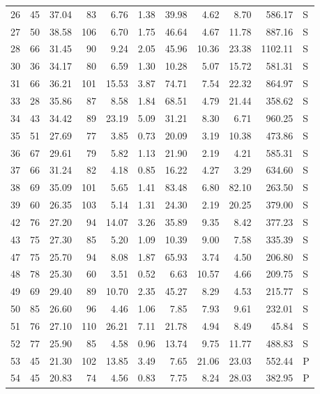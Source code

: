 \begin{table}[ht]
\begin{tabular}{rrrrrrrrrrl}
  26 &  45 & 37.04 &  83 & 6.76 & 1.38 & 39.98 & 4.62 & 8.70 & 586.17 & S \\ 
  27 &  50 & 38.58 & 106 & 6.70 & 1.75 & 46.64 & 4.67 & 11.78 & 887.16 & S \\ 
  28 &  66 & 31.45 &  90 & 9.24 & 2.05 & 45.96 & 10.36 & 23.38 & 1102.11 & S \\ 
  30 &  36 & 34.17 &  80 & 6.59 & 1.30 & 10.28 & 5.07 & 15.72 & 581.31 & S \\ 
  31 &  66 & 36.21 & 101 & 15.53 & 3.87 & 74.71 & 7.54 & 22.32 & 864.97 & S \\ 
  33 &  28 & 35.86 &  87 & 8.58 & 1.84 & 68.51 & 4.79 & 21.44 & 358.62 & S \\ 
  34 &  43 & 34.42 &  89 & 23.19 & 5.09 & 31.21 & 8.30 & 6.71 & 960.25 & S \\ 
  35 &  51 & 27.69 &  77 & 3.85 & 0.73 & 20.09 & 3.19 & 10.38 & 473.86 & S \\ 
  36 &  67 & 29.61 &  79 & 5.82 & 1.13 & 21.90 & 2.19 & 4.21 & 585.31 & S \\ 
  37 &  66 & 31.24 &  82 & 4.18 & 0.85 & 16.22 & 4.27 & 3.29 & 634.60 & S \\ 
  38 &  69 & 35.09 & 101 & 5.65 & 1.41 & 83.48 & 6.80 & 82.10 & 263.50 & S \\ 
  39 &  60 & 26.35 & 103 & 5.14 & 1.31 & 24.30 & 2.19 & 20.25 & 379.00 & S \\ 
  42 &  76 & 27.20 &  94 & 14.07 & 3.26 & 35.89 & 9.35 & 8.42 & 377.23 & S \\ 
  43 &  75 & 27.30 &  85 & 5.20 & 1.09 & 10.39 & 9.00 & 7.58 & 335.39 & S \\ 
  47 &  75 & 25.70 &  94 & 8.08 & 1.87 & 65.93 & 3.74 & 4.50 & 206.80 & S \\ 
  48 &  78 & 25.30 &  60 & 3.51 & 0.52 & 6.63 & 10.57 & 4.66 & 209.75 & S \\ 
  49 &  69 & 29.40 &  89 & 10.70 & 2.35 & 45.27 & 8.29 & 4.53 & 215.77 & S \\ 
  50 &  85 & 26.60 &  96 & 4.46 & 1.06 & 7.85 & 7.93 & 9.61 & 232.01 & S \\ 
  51 &  76 & 27.10 & 110 & 26.21 & 7.11 & 21.78 & 4.94 & 8.49 & 45.84 & S \\ 
  52 &  77 & 25.90 &  85 & 4.58 & 0.96 & 13.74 & 9.75 & 11.77 & 488.83 & S \\ 
  53 &  45 & 21.30 & 102 & 13.85 & 3.49 & 7.65 & 21.06 & 23.03 & 552.44 & P \\ 
  54 &  45 & 20.83 &  74 & 4.56 & 0.83 & 7.75 & 8.24 & 28.03 & 382.95 & P \\ 

\end{tabular}
\end{table}
